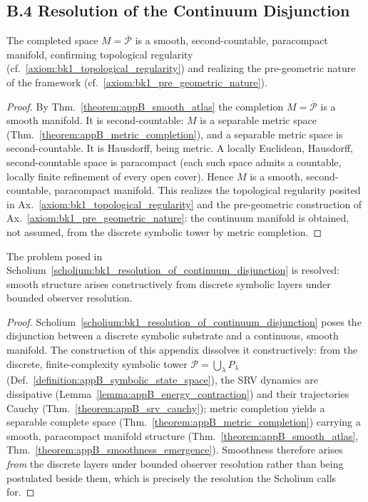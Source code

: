 \subsection*{B.4 Resolution of the Continuum Disjunction}
\label{subsec:appB_continuum_resolution}

\begin{theorem}
\label{theorem:appB_smoothness_emergence}
The completed space $M = \overline{\mathcal{P}}$ is a smooth, second-countable, paracompact manifold, confirming topological regularity (cf.~\ref{axiom:bk1_topological_regularity}) and realizing the pre-geometric nature of the framework (cf.~\ref{axiom:bk1_pre_geometric_nature}).
\end{theorem}
\begin{proof}
\label{proof:appB_smoothness_emergence}
\leavevmode
By Thm.~\ref{theorem:appB_smooth_atlas} the completion $M=\overline{\mathcal{P}}$ is a smooth manifold. It is second-countable: $M$ is a separable metric space (Thm.~\ref{theorem:appB_metric_completion}), and a separable metric space is second-countable. It is Hausdorff, being metric. A locally Euclidean, Hausdorff, second-countable space is paracompact (each such space admits a countable, locally finite refinement of every open cover). Hence $M$ is a smooth, second-countable, paracompact manifold. This realizes the topological regularity posited in Ax.~\ref{axiom:bk1_topological_regularity} and the pre-geometric construction of Ax.~\ref{axiom:bk1_pre_geometric_nature}: the continuum manifold is obtained, not assumed, from the discrete symbolic tower by metric completion.
\end{proof}

\begin{corollary}
\label{corollary:appB_resolution_of_smoothness}
The problem posed in Scholium~\ref{scholium:bk1_resolution_of_continuum_disjunction} is resolved: smooth structure arises constructively from discrete symbolic layers under bounded observer resolution.
\end{corollary}
\begin{proof}
\label{proof:appB_resolution_of_smoothness}
\leavevmode
Scholium~\ref{scholium:bk1_resolution_of_continuum_disjunction} poses the disjunction between a discrete symbolic substrate and a continuous, smooth manifold. The construction of this appendix dissolves it constructively: from the discrete, finite-complexity symbolic tower $\mathcal{P}=\bigcup_\lambda P_\lambda$ (Def.~\ref{definition:appB_symbolic_state_space}), the SRV dynamics are dissipative (Lemma~\ref{lemma:appB_energy_contraction}) and their trajectories Cauchy (Thm.~\ref{theorem:appB_srv_cauchy}); metric completion yields a separable complete space (Thm.~\ref{theorem:appB_metric_completion}) carrying a smooth, paracompact manifold structure (Thm.~\ref{theorem:appB_smooth_atlas}, Thm.~\ref{theorem:appB_smoothness_emergence}). Smoothness therefore arises \emph{from} the discrete layers under bounded observer resolution rather than being postulated beside them, which is precisely the resolution the Scholium calls for.
\end{proof}

